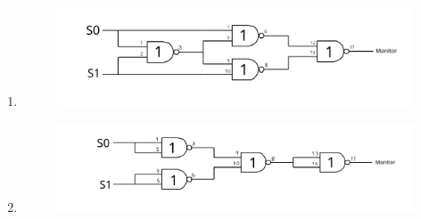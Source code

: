 \documentclass[11pt,a4paper]{article}
\begin{document}
\begin{enumerate}
\begin{figure}[H]
        \end{figure}
    \item
        \begin{figure}[H]
            \includegraphics[width=5in]{B5.png}
        \end{figure}
    \item
        \begin{figure}[H]
            \includegraphics[width=5in]{B6.png}
        \end{figure}
\end{enumerate}
\end{document}
